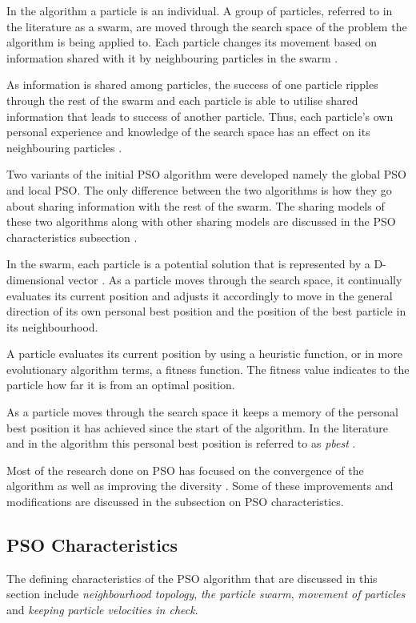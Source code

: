 In the algorithm a particle is an individual\cite{FundamentalSwarm}. A group of particles, referred to in the literature as a swarm,  are moved through the search space of the problem the algorithm is being applied to\cite{FundamentalSwarm}. Each particle changes its movement based on information shared with it by neighbouring particles in the swarm \cite{FundamentalSwarm,CompuIntelligenceIntro}. 

As information is shared among particles, the success of one particle ripples through the rest of the swarm and each particle is able to utilise shared information that leads to success of another particle. Thus, each particle's own personal experience and knowledge of the search space has an effect on its neighbouring particles \cite{FundamentalSwarm,CompuIntelligenceIntro}.

Two variants of the initial \gls{PSO} algorithm were developed namely the global \gls{PSO} and local \gls{PSO}. The only difference between the two algorithms is how they go about sharing information with the rest of the swarm. The sharing models of these two algorithms along with other sharing models are discussed in the \gls{PSO} characteristics subsection \cite{SOSwarm}.

In the swarm, each particle is a potential solution that is represented by a D-dimensional vector \cite{PSOHybridJobShop,PSOSelfHierarch}. As a particle moves through the search space, it continually evaluates its current position and adjusts it accordingly to move in the general direction of its own personal best position and the position of the best particle in its neighbourhood. 

A particle evaluates its current position by using a heuristic function, or in more evolutionary algorithm terms, a fitness function. The fitness value indicates to the particle how far it is from an optimal position\cite{CompuIntelligenceIntro}. 

As a particle moves through the search space it keeps a memory of the personal best position it has achieved since the start of the algorithm. In the literature and in the algorithm this personal best position is referred to as \emph{pbest} \cite{SOSwarm}.

Most of the research done on \gls{PSO} has focused on the convergence of the algorithm as well as improving the diversity \cite{FundamentalSwarm}. Some of these improvements and modifications are discussed in the subsection on \gls{PSO} characteristics.

\subsection{PSO Characteristics}
\label{sec:psocharacteristics}
The defining characteristics of the \gls{PSO} algorithm that are discussed in this section include \emph{neighbourhood topology}, \emph{the particle swarm}, \emph{movement of particles} and \emph{keeping particle velocities in check}.
